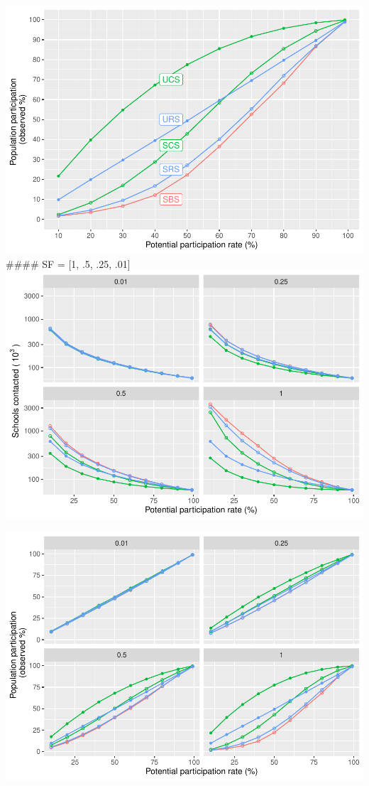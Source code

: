 \documentclass[
  man,floatsintext]{apa6}
\begin{document}
\includegraphics{5---Analysis_files/figure-latex/unnamed-chunk-46-1.pdf}
\#\#\#\# SF = {[}1, .5, .25, .01{]}
\includegraphics{5---Analysis_files/figure-latex/unnamed-chunk-47-1.pdf}

\includegraphics{5---Analysis_files/figure-latex/unnamed-chunk-48-1.pdf}
\end{document}
